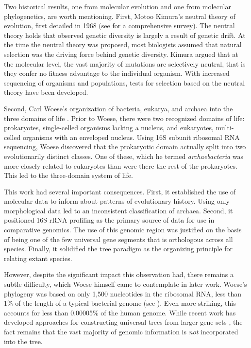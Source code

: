 Two historical results, one from molecular evolution and one from molecular phylogenetics, are worth mentioning.
First, Motoo Kimura's neutral theory of evolution, first detailed in 1968 \cite{Kimura:1968vw} (see \cite{Kimura:1984} for a comprehensive survey).
The neutral theory holds that observed genetic diversity is largely a result of genetic drift.
At the time the neutral theory was proposed, most biologists assumed that natural selection was the driving force behind genetic diversity.
Kimura argued that at the molecular level, the vast majority of mutations are selectively neutral, that is they confer no fitness advantage to the individual organism.
With increased sequencing of organisms and populations, tests for selection based on the neutral theory have been developed.

Second, Carl Woese's organization of bacteria, eukarya, and archaea into the three domains of life \cite{Woese:1977vd}.
Prior to Woese, there were two recognized domains of life: prokaryotes, single-celled organisms lacking a nucleus, and eukaryotes, multi-celled organisms with an enveloped nucleus.
Using 16S subunit ribosomal RNA sequencing, Woese discovered that the prokaryotic domain actually split into two evolutionarily distinct classes.
One of these, which he termed \emph{archaebacteria} was more closely related to eukaryotes than were there the rest of the prokaryotes.
This led to the three-domain system of life.

This work had several important consequences.
First, it established the use of molecular data to inform about patterns of evolutionary history.
Using only morphological data led to an inconsistent classification of archaea.
Second, it positioned 16S rRNA profiling as the primary source of data for use in comparative genomics.
The use of this genomic region was justified on the basis of being one of the few universal gene segments  that is orthologous across all species.
Finally, it solidified the tree paradigm as the organizing principle for relating extant species.

However, despite the significant impact this observation had, there remains a subtle difficulty, which Woese himself came to contemplate in later work.
Woese's phylogeny was based on only 1,500 nucleotides in the ribosomal RNA, less than 1\% of the length of a typical bacterial genome (see \cite{Dagan:2006up}).
Even more striking, this accounts for less than 0.00005\% of the human genome.
While recent work has developed approaches for constructing universal trees from larger gene sets \cite{Ciccarelli:2006gw}, the fact remains that the vast majority of genomic information is \emph{not} incorporated into the tree.

